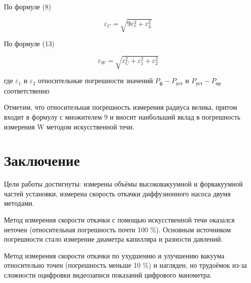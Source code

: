 \documentclass[14pt]{article}
\begin{document}
	\hspace{4mm}По формуле (8)
	
	\begin{equation}
		\varepsilon_C = \sqrt{9\varepsilon_r^2 + \varepsilon_L^2}
	\end{equation}
	
	По формуле (13)
	
	\begin{equation}
		\varepsilon_W = \sqrt{\varepsilon_C^2 + \varepsilon_1^2 +  \varepsilon_2^2}
	\end{equation}
	
	где $\varepsilon_1$ и $\varepsilon_2$ относительные погрешности значений $P_ф - P_{уст}$ и $P_{уст} - P_{пр}$ соответственно
	
	
	Отметим, что относительная погрешность измерения радиуса велика, притом входит в формулу с множителем 9 и вносит наибольший вклад в погрешность измерения W методом искусственной течи.



	
\section*{Заключение}

	\hspace{4mm} Цели работы достигнуты: измерены объёмы высоковакуумной и форвакуумной частей установки, измерена скорость откачки диффузионного насоса двумя методами.
	
	Метод измерения скорости откачки с помощью искусственной течи оказался неточен (относительная погрешность почти 100 \%). Основным источником погрешности стало измерение диаметра капилляра и разности давлений. 
	
	Метод измерения скорости откачки по ухудшению и улучшению вакуума относительно точен (погрешность меньше 10 \%) и нагляден, но трудоёмок из-за сложности оцифровки видеозаписи показаний цифрового манометра.
	
		
\end{document}
